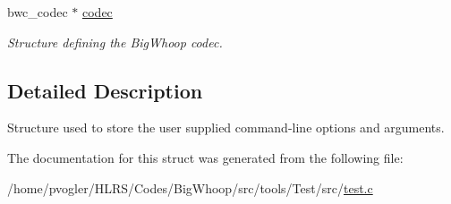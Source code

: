 \begin{DoxyCompactItemize}
\mbox{\label{structcli__arguments_a4cfd29e094fcca61a743096c5043a4e5}} 
bwc\+\_\+codec $\ast$ \mbox{\hyperlink{structcli__arguments_a4cfd29e094fcca61a743096c5043a4e5}{codec}}
\begin{DoxyCompactList}\small\item\em Structure defining the Big\+Whoop codec. \end{DoxyCompactList}\end{DoxyCompactItemize}


\subsection{Detailed Description}
Structure used to store the user supplied command-\/line options and arguments. 

The documentation for this struct was generated from the following file\+:\begin{DoxyCompactItemize}
\item 
/home/pvogler/\+H\+L\+R\+S/\+Codes/\+Big\+Whoop/src/tools/\+Test/src/\mbox{\hyperlink{test_8c}{test.\+c}}\end{DoxyCompactItemize}
